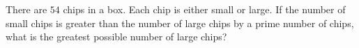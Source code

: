 There are $54$ chips in a box. Each chip is either small or large. If the number of small chips is greater than the number of large chips by a prime number of chips, what is the greatest possible number of large chips?

